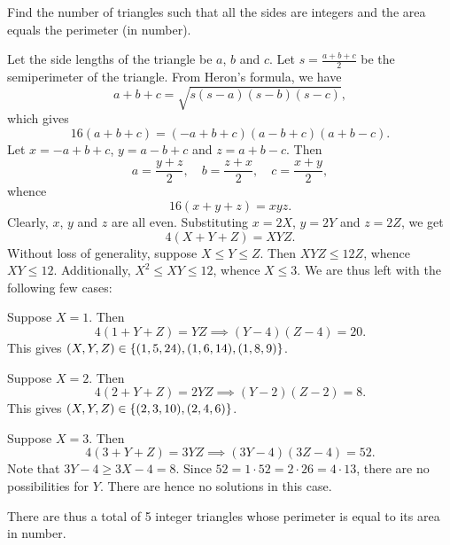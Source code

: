 \begin{question}[5]\label{Q::2023-S-1-25}
    Find the number of triangles such that all the sides are integers and the area equals the perimeter (in number).
\end{question}
\begin{solution*}
    Let the side lengths of the triangle be $a$, $b$ and $c$. Let $s = \frac{a + b + c}{2}$ be the semiperimeter of the triangle. From Heron's formula, we have \[a + b + c = \sqrt{s(s-a)(s-b)(s-c)},\] which gives \[16(a+b+c) = (-a+b+c)(a-b+c)(a+b-c).\] Let $x = -a + b + c$, $y = a-b+c$ and $z = a+b-c$. Then \[a = \frac{y+z}{2}, \quad b = \frac{z+x}{2}, \quad c = \frac{x+y}{2},\] whence \[16(x+y+z) = xyz.\] Clearly, $x$, $y$ and $z$ are all even. Substituting $x = 2X$, $y = 2Y$ and $z = 2Z$, we get \[4(X+Y+Z) = XYZ.\] Without loss of generality, suppose $X \leq Y \leq Z$. Then $XYZ \leq 12Z$, whence $XY \leq 12$. Additionally, $X^2 \leq XY \leq 12$, whence $X \leq 3$. We are thus left with the following few cases:

     Suppose $X = 1$. Then \[4(1 + Y + Z) = YZ \implies (Y-4)(Z-4) = 20.\] This gives $(X, Y, Z) \in \left\lbrace (1, 5, 24), (1, 6, 14), (1, 8, 9) \right\rbrace$.

     Suppose $X = 2$. Then \[4(2 + Y + Z) = 2YZ \implies (Y-2)(Z-2) = 8.\] This gives $(X, Y, Z) \in \left\lbrace (2, 3, 10), (2, 4, 6) \right\rbrace$.

     Suppose $X = 3$. Then \[4(3 + Y + Z) = 3YZ \implies (3Y-4)(3Z-4) = 52.\] Note that $3Y - 4 \geq 3X - 4 = 8$. Since $52 = 1 \cdot 52 = 2 \cdot 26 = 4 \cdot 13$, there are no possibilities for $Y$. There are hence no solutions in this case.

    There are thus a total of 5 integer triangles whose perimeter is equal to its area in number.
\end{solution*}

